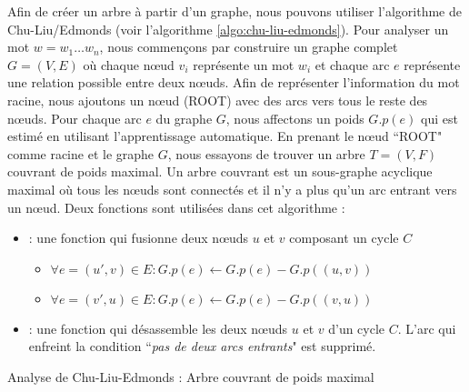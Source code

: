 \documentclass{KodeBook}
\begin{document}
Afin de créer un arbre à partir d'un graphe, nous pouvons utiliser l'algorithme de Chu-Liu/Edmonds (voir l'algorithme \ref{algo:chu-liu-edmonds}).
Pour analyser un mot $w=w_1 \ldots w_n$, nous commençons par construire un graphe complet $G = (V, E)$ où chaque nœud $v_i$ représente un mot $w_i$ et chaque arc $e$ représente une relation possible entre deux nœuds. 
Afin de représenter l'information du mot racine, nous ajoutons un nœud (ROOT) avec des arcs vers tous le reste des nœuds.
Pour chaque arc $e$ du graphe $G$, nous affectons un poids $G.p(e)$ qui est estimé en utilisant l'apprentissage automatique.
En prenant le nœud ``ROOT" comme racine et le graphe $G$, nous essayons de trouver un arbre $T = (V, F)$ couvrant de poids maximal. 
Un arbre couvrant est un sous-graphe acyclique maximal où tous les nœuds sont connectés et il n'y a plus qu'un arc entrant vers un nœud.
Deux fonctions sont utilisées dans cet algorithme :
\begin{itemize}
	\item {} : une fonction qui fusionne deux nœuds $u$ et $v$ composant un cycle $C$
	\begin{itemize}
		\item $\forall e = (u', v) \in E : G.p(e) \leftarrow G.p(e) - G.p((u, v)) $
		\item $\forall e = (v', u) \in E : G.p(e) \leftarrow G.p(e) - G.p((v, u)) $
	\end{itemize}
	\item {} : une fonction qui désassemble les deux nœuds $u$ et $v$ d'un cycle $C$. L'arc qui enfreint la condition ``\textit{pas de deux arcs entrants}" est supprimé.
\end{itemize}

\begin{algorithm}[ht]
	
	
	\caption{Analyse de Chu-Liu-Edmonds : Arbre couvrant de poids maximal\label{algo:chu-liu-edmonds}}
\end{algorithm}
\end{document}
